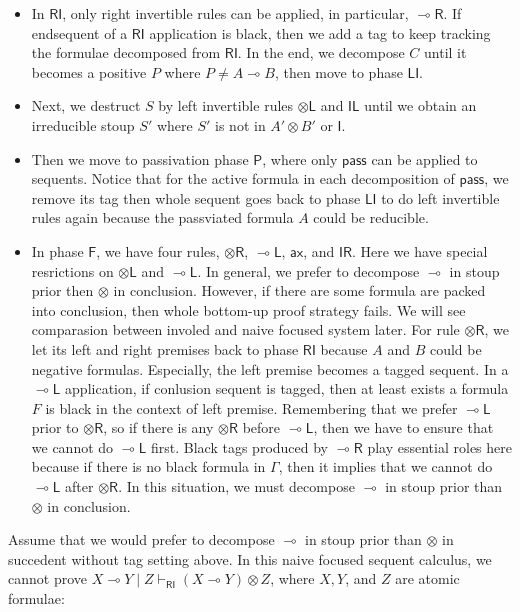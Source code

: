 \documentclass{article}
\newcommand{\tl}{\otimes \mathsf{L}}
\newcommand{\tr}{\otimes \mathsf{R}}
\newcommand{\lright}{\multimap \mathsf{R}}
\newcommand{\lleft}{\multimap \mathsf{L}}
\newcommand{\pass}{\mathsf{pass}}
\newcommand{\unitl}{\mathsf{IL}}
\newcommand{\unitr}{\mathsf{IR}}
\newcommand{\ax}{\mathsf{ax}}
\newcommand{\ot}{\otimes}
\newcommand{\lolli}{\multimap}
\newcommand{\I}{\mathsf{I}}
\newcommand{\RI}{\mathsf{RI}}
\newcommand{\LI}{\mathsf{LI}}
\newcommand{\Pass}{\mathsf{P}}
\newcommand{\F}{\mathsf{F}}
\begin{document}
\begin{itemize}
  \item In $\RI$, only right invertible rules can be applied, in particular, $\lright$.
  If endsequent of a $\RI$ application is black, then we add a tag to keep tracking the formulae decomposed from $\RI$.
  In the end, we decompose $C$ until it becomes a positive $P$ where $P \neq A \lolli B$, then move to phase $\LI$.
  \item Next, we destruct $S$ by left invertible rules $\tl$ and $\unitl$ until we obtain an irreducible stoup $S'$ where $S'$ is not in $A' \ot B'$ or $\I$.
  \item Then we move to passivation phase $\Pass$, where only $\pass$ can be applied to sequents.
  Notice that for the active formula in each decomposition of $\pass$, we remove its tag then whole sequent goes back to phase $\LI$ to do left invertible rules again because the passviated formula $A$ could be reducible.
  \item In phase $\F$, we have four rules, $\tr$, $\lleft$, $\ax$, and $\unitr$.
  Here we have special resrictions on $\tl$ and $\lleft$.
  In general, we prefer to decompose $\lolli$ in stoup prior then $\ot$ in conclusion.
  However, if there are some formula are packed into conclusion, then whole bottom-up proof strategy fails.
  We will see comparasion between involed and naive focused system later.
  For rule $\tr$, we let its left and right premises back to phase $\RI$ because $A$ and $B$ could be negative formulas.
  Especially, the left premise becomes a tagged sequent.
  In a $\lleft$ application, if conlusion sequent is tagged, then at least exists a formula $F$ is black in the context of left premise.
  Remembering that we prefer $\lleft$ prior to $\tr$, so if there is any $\tr$ before $\lleft$, then we have to ensure that we cannot do $\lleft$ first.
  Black tags produced by $\lright$ play essential roles here because if there is no black formula in $\Gamma$, then it implies that we cannot do $\lleft$ after $\tr$.
  In this situation, we must decompose $\lolli$ in stoup prior than $\ot$ in conclusion.
\end{itemize}

Assume that we would prefer to decompose $\lolli$ in stoup prior than $\ot$ in succedent without tag setting above.
In this naive focused sequent calculus, we cannot prove $X \lolli Y \mid Z \vdash_{\RI} (X \lolli Y) \ot Z$, where $X, Y$, and $Z$ are atomic formulae:
\end{document}
